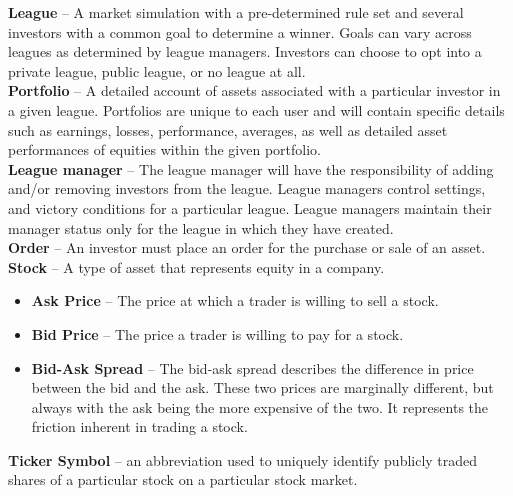 {\textbf{League} -- A market simulation with a pre-determined rule set
and several investors with a common goal to determine a winner. Goals
can vary across leagues as determined by league managers. Investors can
choose to opt into a private league, public league, or no league at all.\\

\textbf{Portfolio} -- A detailed account of assets associated with a
particular investor in a given league. Portfolios are unique to each user
and will contain specific details such as earnings, losses, performance,
averages, as well as detailed asset performances of equities within the
given portfolio.\\

\textbf{League manager} -- The league manager will have the responsibility
of adding and/or removing investors from the league. League managers
control settings, and victory conditions for a particular league. League
managers maintain their manager status only for the league in which they
have created.\\

\textbf{Order} -- An investor must place an order for the purchase or
sale of an asset.\\

\textbf{Stock} -- A type of asset that represents equity in a company.
\begin{itemize}
    \item \textbf{Ask Price} -- The price at which a trader is willing
                                to sell a stock.\\
    \item \textbf{Bid Price} -- The price a trader is willing to pay for
                                a stock.\\
    \item \textbf{Bid-Ask Spread} -- The bid-ask spread describes the
                                     difference in price between the bid
                                     and the ask. These two prices are
                                     marginally different, but always with
                                     the ask being the more expensive of the
                                     two. It represents the friction inherent
                                     in trading a stock.\\
\end{itemize}

\textbf{Ticker Symbol} -- an abbreviation used to uniquely identify publicly
traded shares of a particular stock on a particular stock market.\\

}
